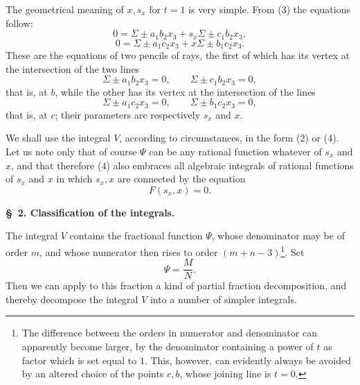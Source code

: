 \documentclass[10pt]{article}
\begin{document}
The geometrical meaning of $x,s_x$ for $t=1$ is very simple. From (3) the equations follow:
\[
0=\Sigma\pm a_1b_2x_3+s_x\Sigma\pm c_1b_2x_3,
\]
\[
0=\Sigma\pm a_1c_2x_3+x\Sigma\pm b_1c_2x_3.
\]
These are the equations of two pencils of rays, the first of which has its vertex at the intersection of the two lines
\[
\Sigma\pm a_1b_2x_3=0,
\qquad
\Sigma\pm c_1b_2x_3=0,
\]
that is, at $b$, while the other has its vertex at the intersection of the lines
\[
\Sigma\pm a_1c_2x_3=0,
\qquad
\Sigma\pm b_1c_2x_3=0,
\]
that is, at $c$; their parameters are respectively $s_x$ and $x$.

We shall use the integral $V$, according to circumstances, in the form (2) or (4). Let us note only that of course $\Psi$ can be any rational function whatever of $s_x$ and $x$, and that therefore (4) also embraces all algebraic integrals of rational functions of $s_x$ and $x$ in which $s_x,x$ are connected by the equation
\[
F(s_x,x)=0.
\]

\begin{center}
{\bfseries \S\ 2. Classification of the integrals.}
\end{center}

The integral $V$ contains the fractional function $\Psi$, whose denominator may be of order $m$, and whose numerator then rises to order $(m+n-3)$\footnote{The difference between the orders in numerator and denominator can apparently become larger, by the denominator containing a power of $t$ as factor which is set equal to $1$. This, however, can evidently always be avoided by an altered choice of the points $c,b$, whose joining line is $t=0$.}. Set
\[
\Psi=\frac{M}{N}.
\]
Then we can apply to this fraction a kind of partial fraction decomposition, and thereby decompose the integral $V$ into a number of simpler integrals.
\end{document}
